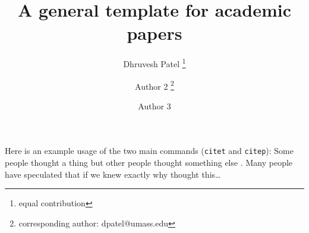 \documentclass{article}
\title{A general template for academic papers}
\author[$\diamondsuit$]{Dhruvesh Patel \thanks{equal contribution}}
\author[$\diamondsuit$,$\heartsuit$]{Author 2 \protect\footnotemark[\value{footnote}]\thanks{corresponding author: dpatel@umass.edu}} %
\author[$\heartsuit$]{Author 3}
\affil[$\diamondsuit$]{
	University of Massachusetts Amherst}
\affil[$\heartsuit$]{
University of Pittsburgh}
\date{}
\begin{document}
\maketitle







Here is an example usage of the two main commands (\verb+citet+ and \verb+citep+): Some people thought a thing \citep{kour2014real} but other people thought something else \citep{kour2014real}. Many people have speculated that if we knew exactly why \citet{kour2014real} thought this\dots




\end{document}
